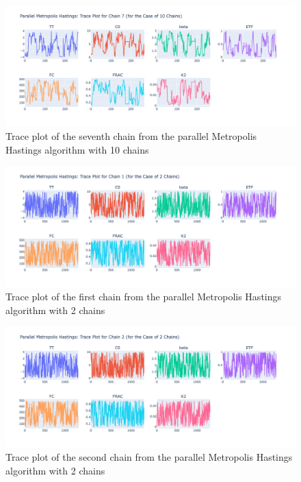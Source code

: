 \begin{figure}[H]
    \centering
    \includegraphics[width=1\textwidth]{figures/parallel_mh/tp_rand_10_7.png}
    \captionsetup{width=.8\textwidth}
    \caption{Trace plot of the seventh chain from the parallel Metropolis Hastings algorithm with 10 chains}
    \label{fig:enter-label}
\end{figure}

\begin{figure}[H]
    \centering
    \includegraphics[width=1\textwidth]{figures/parallel_mh/tp_rand_2_1.png}
    \captionsetup{width=.8\textwidth}
    \caption{Trace plot of the first chain from the parallel Metropolis Hastings algorithm with 2 chains}
    \label{fig:enter-label}
\end{figure}

\begin{figure}[H]
    \centering
    \includegraphics[width=1\textwidth]{figures/parallel_mh/tp_rand_2_2.png}
    \captionsetup{width=.8\textwidth}
    \caption{Trace plot of the second chain from the parallel Metropolis Hastings algorithm with 2 chains}
    \label{fig:enter-label}
\end{figure}


